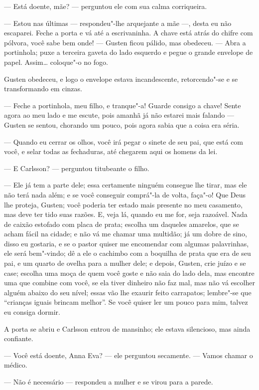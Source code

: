 --- Está doente, mãe? --- perguntou ele com sua calma corriqueira.

--- Estou nas últimas --- respondeu"-lhe arquejante a mãe ---, desta eu não
escaparei. Feche a porta e vá até a escrivaninha. A chave está atrás do chifre
com pólvora, você sabe bem onde! --- Gusten ficou pálido, mas obedeceu. --- Abra a
portinhola; puxe a terceira gaveta do lado esquerdo e pegue o grande envelope de
papel. Assim\ldots{} coloque"-o no fogo.

 Gusten obedeceu, e logo o envelope estava incandescente, retorcendo"-se e
 se transformando em cinzas.

--- Feche a portinhola, meu filho, e tranque"-a! Guarde consigo a chave! Sente
agora ao meu lado e me escute, pois amanhã já não estarei mais falando --- Gusten
se sentou, chorando um pouco, pois agora sabia que a coisa era séria.

--- Quando eu cerrar os olhos, você irá pegar o sinete de seu pai, que está com
você, e selar todas as fechaduras, até chegarem aqui os homens da lei.

 --- E Carlsson? --- perguntou titubeante o filho.

 --- Ele já tem a parte dele; essa certamente ninguém consegue lhe tirar, mas ele não terá
 nada além; e se você conseguir comprá"-la de volta, faça"-o! Que Deus lhe proteja, 
 Gusten; você poderia ter estado mais presente no meu casamento, mas 
 deve ter tido suas razões. E, veja lá, quando eu me for, seja razoável. Nada de 
 caixão estofado com placa de prata; escolha um daqueles amarelos, que se acham
 fácil na cidade; e não vá me chamar uma multidão; já um dobre de sino, disso
 eu gostaria, e se o pastor quiser me encomendar com algumas palavrinhas, ele
 será bem"-vindo; dê a ele o cachimbo com a boquilha de prata que era de seu pai,
 e um quarto de ovelha para a mulher dele; e depois, Gusten, crie juízo e
 se case; escolha uma moça de quem você goste e não saia do lado dela, mas encontre uma
 que combine com você, se ela tiver dinheiro não faz mal, mas não vá escolher
 alguém abaixo do seu nível; essas vão lhe exaurir feito carrapatos; lembre"-se
 que ``crianças iguais brincam melhor''. Se você quiser ler um pouco
 para mim, talvez eu consiga dormir.

 A porta se abriu e Carlsson entrou de mansinho; ele estava silencioso, mas
 ainda confiante.

--- Você está doente, Anna Eva? --- ele perguntou secamente. --- Vamos chamar o
médico.

--- Não é necessário --- respondeu a mulher e se virou para a parede.

